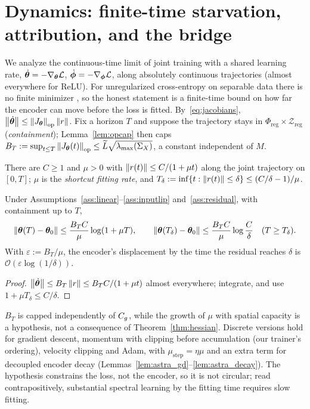 \section{Dynamics: finite-time starvation, attribution, and the bridge}
\label{sec:dynamics}

We analyze the continuous-time limit of joint training with a shared
learning rate, $\dot{{\boldsymbol{\theta}}}=-\nabla_{\boldsymbol{\theta}}\mathcal{L}$,
$\dot{{\boldsymbol{\phi}}}=-\nabla_{\boldsymbol{\phi}}\mathcal{L}$, along absolutely continuous trajectories
(almost everywhere for ReLU). For unregularized cross-entropy on separable
data there is no finite minimizer \citep{soudry2018implicit}, so the honest
statement is a finite-time bound on how far the encoder can move before the
loss is fitted. By~\eqref{eq:jacobians},
$\left\lVert\dot{{\boldsymbol{\theta}}}\right\rVert\le\left\lVert J_{\boldsymbol{\theta}}\right\rVert_{\mathrm{op}}\left\lVert r\right\rVert$. Fix a horizon
$T$ and suppose the trajectory stays in
$\Phi_{\mathrm{reg}}\times\mathcal{Z}_{\mathrm{reg}}$ (\emph{containment});
Lemma~\ref{lem:opcap} then caps
$B_T:=\sup_{t\le T}\left\lVert J_{\boldsymbol{\theta}}(t)\right\rVert_{\mathrm{op}}\le
\widetilde L\sqrt{\lambda_{\max}(\Sigma_X)}$, a constant independent of $M$.

\begin{assumption}
\label{ass:residual}
There are $C\ge1$ and $\mu>0$ with $\left\lVert r(t)\right\rVert\le C/(1+\mu t)$ along the
joint trajectory on $[0,T]$; $\mu$ is the \emph{shortcut fitting rate}, and
$T_\delta:=\inf\{t:\left\lVert r(t)\right\rVert\le\delta\}\le(C/\delta-1)/\mu$.
\end{assumption}

\begin{theorem}
\label{thm:twoscale}
Under Assumptions~\ref{ass:linear}--\ref{ass:inputlip} and~\ref{ass:residual},
with containment up to $T$,
\[
  \left\lVert{\boldsymbol{\theta}}(T)-{\boldsymbol{\theta}}_0\right\rVert\le\frac{B_TC}{\mu}\log(1+\mu T),
  \qquad
  \left\lVert{\boldsymbol{\theta}}(T_\delta)-{\boldsymbol{\theta}}_0\right\rVert\le\frac{B_TC}{\mu}\log\frac{C}{\delta}
  \quad(T\ge T_\delta).
\]
With $\varepsilon:=B_T/\mu$, the encoder's displacement by the time the
residual reaches $\delta$ is $\mathcal{O}(\varepsilon\log(1/\delta))$.
\end{theorem}
\begin{proof}
$\left\lVert\dot{{\boldsymbol{\theta}}}\right\rVert\le B_T\left\lVert r\right\rVert\le B_TC/(1+\mu t)$ almost everywhere;
integrate, and use $1+\mu T_\delta\le C/\delta$.
\end{proof}

$B_T$ is capped independently of $C_g$, while the growth of $\mu$ with
spatial capacity is a hypothesis, not a consequence of
Theorem~\ref{thm:hessian}. Discrete versions hold for gradient descent,
momentum with clipping before accumulation (our trainer's ordering),
velocity clipping and Adam, with $\mu_{\mathrm{step}}=\eta\mu$ and an extra
term for decoupled encoder decay
(Lemmas~\ref{lem:astra_gd}--\ref{lem:astra_decay}). The hypothesis
constrains the loss, not the encoder, so it is not circular; read
contrapositively, substantial spectral learning by the fitting time requires
slow fitting.

